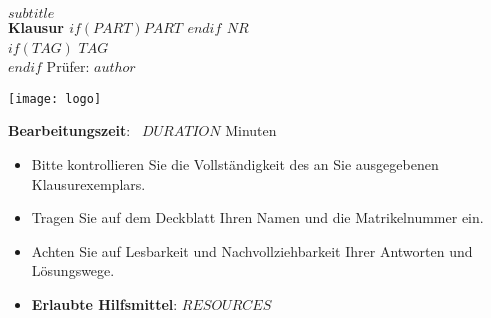 
\begin{coverpages}
    \begin{minipage}[c]{0.75\textwidth}
        \parindent0pt
        \textcolor{headcolor}{\large\scshape{$subtitle$}}\\[1ex]
        \textcolor{headcolor}{\Large\textbf{Klausur $if(PART)$$PART$ \xspace$endif$ $NR$}}\\[2ex]
        $if(TAG)$
        \textbf{$TAG$}\\[2ex]
        $endif$
        \parindent0pt
        \textcolor{headcolor}{Prüfer:} $author$
    \end{minipage}
    \begin{minipage}[c]{0.25\textwidth}
        \texttt{[image: logo]}
    \end{minipage}
    \vspace{10mm}
    \par\hrulefill\par
    \begin{minipage}[c]{0.5\textwidth}
        \begin{minipage}[c]{0.96\textwidth}
            \vspace{2mm}
            {\textbf{Bearbeitungszeit}: {\ }$DURATION$ Minuten}\par
            \bigskip
            \begin{itemize}
                \item Bitte kontrollieren Sie die Vollständigkeit des an Sie
                ausgegebenen Klausurexemplars.
                \medskip
                \item Tragen Sie auf dem Deckblatt Ihren Namen und die
                Matrikelnummer ein.
                \medskip
                \item Achten Sie auf Lesbarkeit und Nachvollziehbarkeit Ihrer
                Antworten und Lösungswege.
                \medskip
                \item \textbf{Erlaubte Hilfsmittel}: $RESOURCES$



\end{itemize}
\end{minipage}
\end{minipage}
\end{coverpages}
